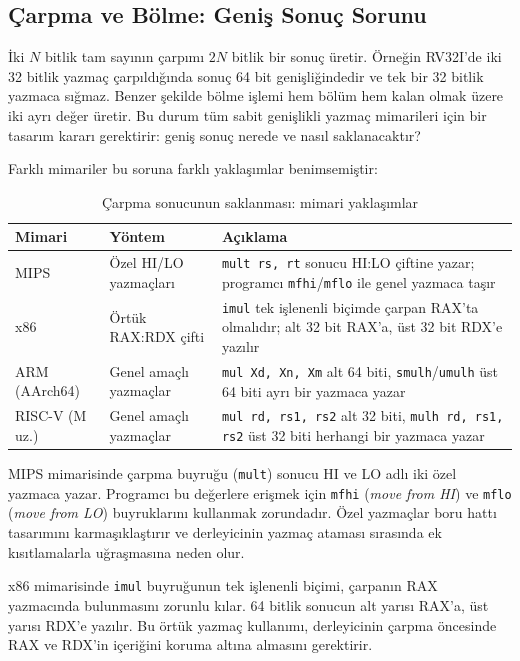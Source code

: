 \subsection{Çarpma ve Bölme: Geniş Sonuç Sorunu}
\label{sec:carpma-bolme-sorunu}

İki $N$ bitlik tam sayının çarpımı $2N$ bitlik bir sonuç üretir. Örneğin RV32I'de iki 32 bitlik yazmaç çarpıldığında sonuç 64 bit genişliğindedir ve tek bir 32 bitlik yazmaca sığmaz. Benzer şekilde bölme işlemi hem bölüm hem kalan olmak üzere iki ayrı değer üretir. Bu durum tüm sabit genişlikli yazmaç mimarileri için bir tasarım kararı gerektirir: geniş sonuç nerede ve nasıl saklanacaktır?

Farklı mimariler bu soruna farklı yaklaşımlar benimsemiştir:

\begin{table}[H]
\centering
\caption{Çarpma sonucunun saklanması: mimari yaklaşımlar}
\label{tab:carpma-saklama}
\small
\begin{tabular}{lp{3.2cm}p{7.5cm}}
\toprule
\textbf{Mimari} & \textbf{Yöntem} & \textbf{Açıklama} \\
\midrule
MIPS & Özel HI/LO yazmaçları & \texttt{mult rs, rt} sonucu HI:LO çiftine yazar; programcı \texttt{mfhi}/\texttt{mflo} ile genel yazmaca taşır \\[3pt]
x86 & Örtük RAX:RDX çifti & \texttt{imul} tek işlenenli biçimde çarpan RAX'ta olmalıdır; alt 32 bit RAX'a, üst 32 bit RDX'e yazılır \\[3pt]
ARM (AArch64) & Genel amaçlı yazmaçlar & \texttt{mul Xd, Xn, Xm} alt 64 biti, \texttt{smulh}/\texttt{umulh} üst 64 biti ayrı bir yazmaca yazar \\[3pt]
RISC-V (M uz.) & Genel amaçlı yazmaçlar & \texttt{mul rd, rs1, rs2} alt 32 biti, \texttt{mulh rd, rs1, rs2} üst 32 biti herhangi bir yazmaca yazar \\
\bottomrule
\end{tabular}
\end{table}

MIPS mimarisinde çarpma buyruğu (\texttt{mult}) sonucu HI ve LO adlı iki özel yazmaca yazar. Programcı bu değerlere erişmek için \texttt{mfhi} (\emph{move from HI}) ve \texttt{mflo} (\emph{move from LO}) buyruklarını kullanmak zorundadır. Özel yazmaçlar boru hattı tasarımını karmaşıklaştırır ve derleyicinin yazmaç ataması sırasında ek kısıtlamalarla uğraşmasına neden olur.

x86 mimarisinde \texttt{imul} buyruğunun tek işlenenli biçimi, çarpanın RAX yazmacında bulunmasını zorunlu kılar. 64 bitlik sonucun alt yarısı RAX'a, üst yarısı RDX'e yazılır. Bu örtük yazmaç kullanımı, derleyicinin çarpma öncesinde RAX ve RDX'in içeriğini koruma altına almasını gerektirir.

